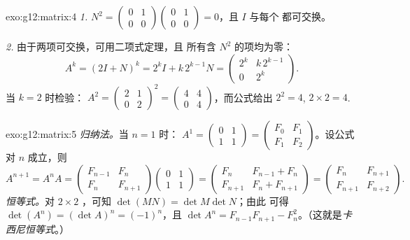 \begin{solution}{exo:g12:matrix:4}
\emph{1.} $N^2 = \begin{pmatrix} 0&1\\0&0\end{pmatrix}
\begin{pmatrix} 0&1\\0&0\end{pmatrix} = 0$，且 $I$ 与每个
都可交换。

\emph{2.} 由于两项可交换，可用二项式定理，且
所有含 $N^2$ 的项均为零：
\[
A^k = (2I + N)^k = 2^k I + k\,2^{k-1} N
= \begin{pmatrix} 2^k & k\,2^{k-1}\\ 0 & 2^k \end{pmatrix}.
\]
当 $k = 2$ 时检验：
$A^2 = \begin{pmatrix} 2&1\\0&2\end{pmatrix}^2
= \begin{pmatrix} 4&4\\0&4\end{pmatrix}$，而公式给出
$2^2 = 4$, $2 \times 2 = 4$. \checkmark
\end{solution}

\begin{solution}{exo:g12:matrix:5}
\emph{归纳法。}当 $n = 1$ 时：
$A^1 = \begin{pmatrix} 0&1\\1&1\end{pmatrix}
= \begin{pmatrix} F_0 & F_1\\ F_1 & F_2\end{pmatrix}$。设公式对
$n$ 成立，则
\[
A^{n+1} = A^n A
= \begin{pmatrix} F_{n-1} & F_n\\ F_n & F_{n+1}\end{pmatrix}
\begin{pmatrix} 0 & 1\\ 1 & 1\end{pmatrix}
= \begin{pmatrix} F_n & F_{n-1} + F_n\\ F_{n+1} & F_n + F_{n+1}\end{pmatrix}
= \begin{pmatrix} F_n & F_{n+1}\\ F_{n+1} & F_{n+2}\end{pmatrix}.
\]
\emph{恒等式。}对 $2\times2$ ，可知
$\det(MN) = \det M \det N$；由此
可得 $\det(A^n) = (\det A)^n = (-1)^n$，且
$\det A^n = F_{n-1}F_{n+1} - F_n^2$。（这就是\emph{卡西尼恒等式}。）
\end{solution}

